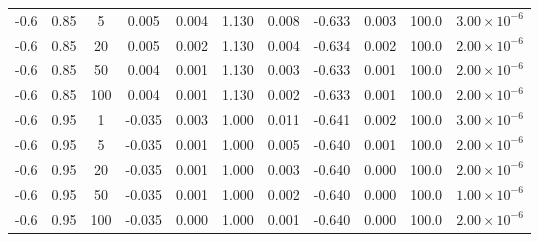\documentclass[twoside]{article}
\begin{document}
\begin{table}[htbp]
\begin{center}
\begin{tabular}{|c|c|c|cc|cc|cc|c|c|}
-0.6 & 0.85 & 5 & 0.005 & 0.004 & 1.130 & 0.008 & -0.633 & 0.003 & 100.0 & $3.00\times10^{-6}$ \\
-0.6 & 0.85 & 20 & 0.005 & 0.002 & 1.130 & 0.004 & -0.634 & 0.002 & 100.0 & $2.00\times10^{-6}$ \\
-0.6 & 0.85 & 50 & 0.004 & 0.001 & 1.130 & 0.003 & -0.633 & 0.001 & 100.0 & $2.00\times10^{-6}$ \\
-0.6 & 0.85 & 100 & 0.004 & 0.001 & 1.130 & 0.002 & -0.633 & 0.001 & 100.0 & $2.00\times10^{-6}$ \\ \hline
-0.6 & 0.95 & 1 & -0.035 & 0.003 & 1.000 & 0.011 & -0.641 & 0.002 & 100.0 & $3.00\times10^{-6}$ \\
-0.6 & 0.95 & 5 & -0.035 & 0.001 & 1.000 & 0.005 & -0.640 & 0.001 & 100.0 & $2.00\times10^{-6}$ \\
-0.6 & 0.95 & 20 & -0.035 & 0.001 & 1.000 & 0.003 & -0.640 & 0.000 & 100.0 & $2.00\times10^{-6}$ \\
-0.6 & 0.95 & 50 & -0.035 & 0.001 & 1.000 & 0.002 & -0.640 & 0.000 & 100.0 & $1.00\times10^{-6}$ \\
-0.6 & 0.95 & 100 & -0.035 & 0.000 & 1.000 & 0.001 & -0.640 & 0.000 & 100.0 & $2.00\times10^{-6}$ \\ \hline
\end{tabular}
\end{center}
\end{table}
\end{document}
